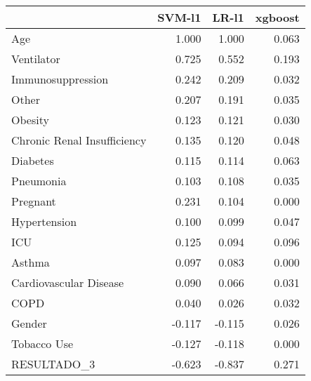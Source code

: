 \begin{tabular}{lrrr}
\toprule
{} &  SVM-l1 &  LR-l1 &  xgboost \\
\midrule
Age                         &   1.000 &  1.000 &    0.063 \\
Ventilator                  &   0.725 &  0.552 &    0.193 \\
Immunosuppression           &   0.242 &  0.209 &    0.032 \\
Other                       &   0.207 &  0.191 &    0.035 \\
Obesity                     &   0.123 &  0.121 &    0.030 \\
Chronic Renal Insufficiency &   0.135 &  0.120 &    0.048 \\
Diabetes                    &   0.115 &  0.114 &    0.063 \\
Pneumonia                   &   0.103 &  0.108 &    0.035 \\
Pregnant                    &   0.231 &  0.104 &    0.000 \\
Hypertension                &   0.100 &  0.099 &    0.047 \\
ICU                         &   0.125 &  0.094 &    0.096 \\
Asthma                      &   0.097 &  0.083 &    0.000 \\
Cardiovascular Disease      &   0.090 &  0.066 &    0.031 \\
COPD                        &   0.040 &  0.026 &    0.032 \\
Gender                      &  -0.117 & -0.115 &    0.026 \\
Tobacco Use                 &  -0.127 & -0.118 &    0.000 \\
RESULTADO\_3                 &  -0.623 & -0.837 &    0.271 \\
\bottomrule
\end{tabular}
